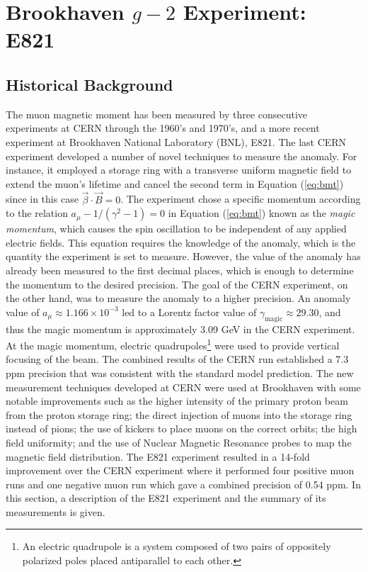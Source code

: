 \documentclass{outhesis}
\begin{document}
\section{Brookhaven $g-2$ Experiment: E821}
\label{sec:exp}
\subsection{Historical Background}
The muon magnetic moment has been measured by three consecutive experiments at CERN through the 1960's and 1970's, and a more recent experiment at Brookhaven National Laboratory (BNL), E821. The last CERN experiment developed a number of novel techniques to measure the anomaly. For instance, it employed a storage ring with a transverse uniform magnetic field to extend the muon's lifetime and cancel the second term in Equation (\ref{eq:bmt}) since in this case $\overrightarrow{\beta} \cdot \overrightarrow{B} = 0$. The experiment chose a specific momentum according to the relation $a_{\mu} -1/\left(\gamma^2-1\right) = 0$ in Equation  (\ref{eq:bmt}) known as the \emph{magic momentum}, which causes the spin oscillation to be independent of any applied electric fields. This equation requires the knowledge of the anomaly, which is the quantity the experiment is set to measure. However, the value of the anomaly has already been measured to the first decimal places, which is enough to determine the momentum to the desired precision. The goal of the CERN experiment, on the other hand, was to measure the anomaly to a higher precision. An anomaly value of $a_{\mu} \approx 1.166\times 10^{-3}$ led to a Lorentz factor value of $\gamma_{\text{magic}} \approx 29.30$, and thus the magic momentum is approximately 3.09 GeV in the CERN experiment. 
At the magic momentum, electric quadrupoles\footnote{An electric quadrupole is a system composed of two pairs of oppositely polarized poles placed antiparallel to each other.} were used to provide vertical focusing of the beam. The combined results of the CERN run established a 7.3 ppm precision that was consistent with the standard model prediction. The new measurement techniques developed at CERN were used at Brookhaven with some notable improvements such as the higher intensity of the primary proton beam from the proton storage ring; the direct injection of muons into the storage ring instead of pions; the use of kickers to place muons on the correct orbits; the  high field uniformity; and the use of Nuclear Magnetic Resonance probes to map the magnetic field distribution. The E821 experiment resulted in a 14-fold improvement over the CERN experiment where it performed four positive muon runs and one negative muon run which gave a combined precision of 0.54 ppm. In this section, a description of the E821 experiment and the summary of its measurements is given.
\end{document}
